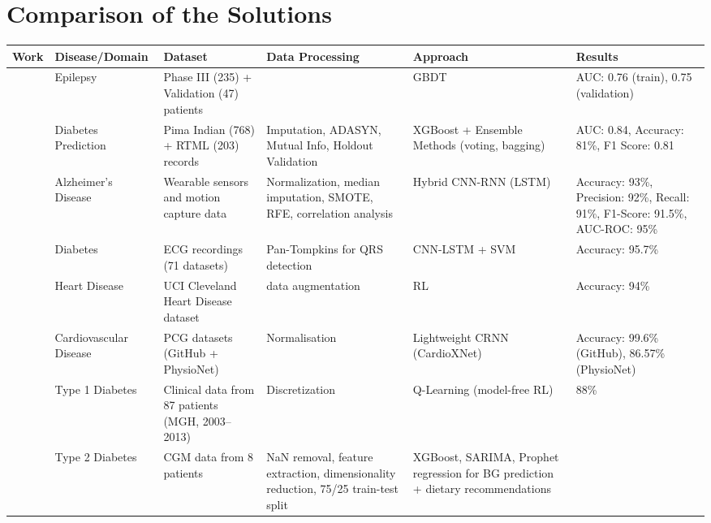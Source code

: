\section{Comparison of the Solutions}
\begin{table}[htbp]
\begin{adjustwidth}{-2cm}{-2cm}
\centering
\scriptsize
\begin{tabular}{|p{1.5cm}|p{2.5cm}|p{3cm}|p{3.5cm}|p{2.5cm}|p{2.5cm}|}
\hline
\textbf{Work} & \textbf{Disease/Domain} & \textbf{Dataset} & \textbf{Data Processing} & \textbf{Approach} & \textbf{Results} \\
\hline
\cite{article_1} & Epilepsy & Phase III (235) + Validation (47) patients &   & GBDT & AUC: 0.76 (train), 0.75 (validation) \\
\hline
\cite{article_2} & Diabetes Prediction & Pima Indian (768) + RTML (203) records & Imputation, ADASYN, Mutual Info, Holdout Validation & XGBoost + Ensemble Methods (voting, bagging) & AUC: 0.84, Accuracy: 81\%, F1 Score: 0.81 \\
\hline
\cite{article_3} & Alzheimer's Disease & Wearable sensors and motion capture data & Normalization, median imputation, SMOTE, RFE, correlation analysis & Hybrid CNN-RNN (LSTM) & Accuracy: 93\%, Precision: 92\%, Recall: 91\%, F1-Score: 91.5\%, AUC-ROC: 95\% \\
\hline
\cite{article_4} & Diabetes & ECG recordings (71 datasets) & Pan-Tompkins for QRS detection & CNN-LSTM + SVM & Accuracy: 95.7\% \\
\hline
\cite{article_5} & Heart Disease & UCI Cleveland Heart Disease dataset & data augmentation & RL & Accuracy: 94\% \\
\hline
\cite{article_6} & Cardiovascular Disease & PCG datasets (GitHub + PhysioNet) & Normalisation & Lightweight CRNN (CardioXNet) & Accuracy: 99.6\% (GitHub), 86.57\% (PhysioNet) \\
\hline
\cite{article_7} & Type 1 Diabetes & Clinical data from 87 patients (MGH, 2003–2013) & Discretization & Q-Learning (model-free RL) & 88\% \\
\hline
\cite{article_9} & Type 2 Diabetes & CGM data from 8 patients & NaN removal, feature extraction, dimensionality reduction, 75/25 train-test split & XGBoost, SARIMA, Prophet regression for BG prediction + dietary recommendations &  \\

\end{tabular}
\end{adjustwidth}
\end{table}
